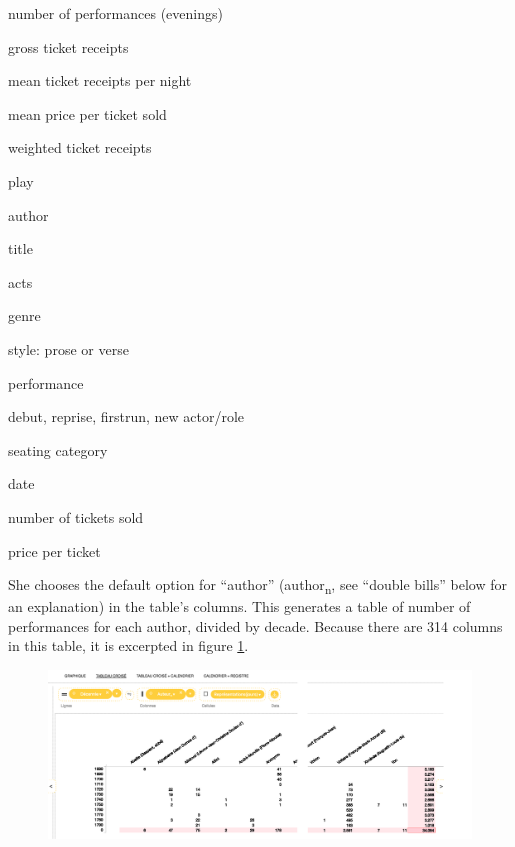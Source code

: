 \documentclass[	DIV=calc,%
							paper=a4,%
							fontsize=11pt,%
							twocolumn]{scrartcl}	 					%
\begin{document}
\begin{framefloat}[b]
	\fontsize{8pt}{8pt}\selectfont
  \begin{description}[noitemsep,align=left]

		\item[Measures]
			\item number of performances (evenings)
			\item gross ticket receipts
			\item mean ticket receipts per night
			\item mean price per ticket sold
			\item weighted ticket receipts

    \vspace{10pt}
		\item[Dimensions]
			\item play
			\item author
			\item title
			\item acts
			\item genre
			\item style: prose or verse
			\item performance
			\item debut, reprise, firstrun, new actor/role
			\item seating category

    \hrulefill
		\item[Facts]
			\item date
			\item number of tickets sold
			\item price per ticket
  \end{description}
\end{framefloat}

She chooses the default option for ``author'' (author\textsubscript{n}, see ``double bills'' below for an explanation) in the table’s columns.  This generates a table of number of performances for each author, divided by decade.  Because there are 314 columns in this table, it is excerpted in figure \ref{fig:stitched-author-table}.

\begin{figure}
  \centering
	\includegraphics[width=7in]{steps/stitched-author-table.png}
	\caption{}
	\label{fig:stitched-author-table}
\end{figure}
\end{document}
